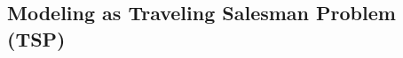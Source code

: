 \documentclass[a4paper]{article}
\begin{document}







\subsection{Modeling as Traveling Salesman Problem (TSP)}

\end{document}
